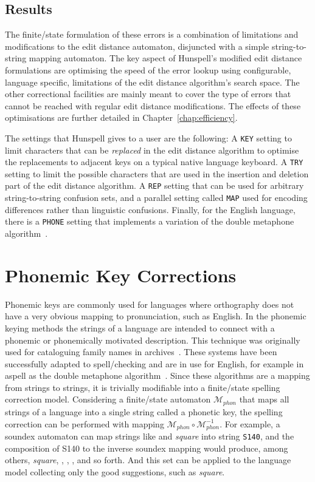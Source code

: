 \documentclass[officiallayout,final]{unihelcompling}
\newcommand\misspelt{\bgroup\markoverwith
{\textcolor{red}{\lower3.5pt\hbox{\sixly \char58}}}\ULon}
\begin{document}
\subsection{Results}

The finite\-/state formulation of these errors is a combination of limitations
and modifications to the edit distance automaton, disjuncted with a simple
string-to-string mapping automaton. The key aspect of Hunspell's modified edit
distance formulations are optimising the speed of the error lookup using
configurable, language specific, limitations of the edit distance algorithm's
search space. The other correctional facilities are mainly meant to cover the
type of errors that cannot be reached with regular edit distance modifications.
The effects of these optimisations are further detailed in
Chapter~\ref{chap:efficiency}.

The settings that Hunspell gives to a user are the following: A \texttt{KEY}
setting to limit characters that can be \emph{replaced} in the edit distance
algorithm to optimise the replacements to adjacent keys on a typical native
language keyboard. A \texttt{TRY} setting to limit the possible characters
that are used in the insertion and deletion part of the edit distance
algorithm. A \texttt{REP} setting that can be used for arbitrary
string-to-string confusion sets, and a parallel setting called \texttt{MAP}
used for encoding differences rather than linguistic confusions.  Finally, for
the English language, there is a \texttt{PHONE} setting that implements a
variation of the double metaphone algorithm~\citep{philips2000double}.

\section{Phonemic Key Corrections}
\label{sec:phonemic}

Phonemic keys are commonly used for languages where orthography does not have a
very obvious mapping to pronunciation, such as English. In the phonemic keying
methods the strings of a language are intended to connect with a phonemic or
phonemically motivated description. This technique was originally used for
cataloguing family names in archives~\citep{russell1918soundex}. These systems
have been successfully adapted to spell\-/checking and are in use for English,
for example in aspell as the double metaphone
algorithm~\citep{philips2000double}.  Since these algorithms are a mapping from
strings to strings, it is trivially modifiable into a finite\-/state spelling
correction model. Considering a finite\-/state automaton $\mathcal{M}_{phon}$
that maps all strings of a language into a single string called a phonetic key,
the spelling correction can be performed with mapping $\mathcal{M}_{phon} \circ
\mathcal{M}_{phon}^{-1}$.  For example, a soundex automaton can map strings
like \misspelt{squer} and \emph{square} into string \texttt{S140}, and the
composition of S140 to the inverse soundex mapping would produce, among
others, \emph{square}, \misspelt{squer}, \misspelt{sqr}, \misspelt{sqrrr}, and
so forth. And this set can be applied to the language model collecting only the
good suggestions, such as \emph{square}.
\end{document}
